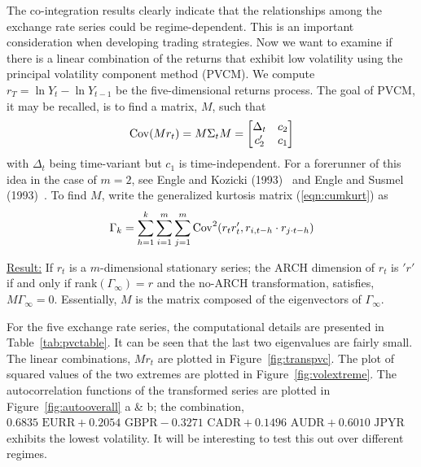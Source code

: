 The co-integration results clearly indicate that the relationships among the exchange rate series could be regime-dependent. This is an important consideration when developing trading strategies. Now we want to examine if there is a linear combination of the returns that exhibit low volatility using the principal volatility component method (PVCM). We compute $r_T=\ln Y_t - \ln Y_{t-1}$ be the five-dimensional returns process. The goal of PVCM, it may be recalled, is to find a matrix, $M$, such that
	\begin{equation}\label{eqn:covmatrixM}
	\Cov(Mr_t)= M \Sigma_t M= 
	\begin{bmatrix}
	\Delta_t & c_2 \\
	c_2' & c_1
	\end{bmatrix}
	\end{equation}	
with $\Delta_t$ being time-variant but $c_1$ is time-independent. For a forerunner of this idea in the case of $m=2$, see Engle and Kozicki (1993)~\cite{engle1993testing} and Engle and Susmel (1993)~\cite{engle1993common}. To find $M$, write the generalized kurtosis matrix (\ref{eqn:cumkurt}) as
	\begin{equation}\label{eqn:gammakurt}
	\Gamma_k= \sum_{h=1}^k \sum_{i=1}^m \sum_{j=1}^m \Cov^2(r_tr_t', r_{i,t-h} \cdot r_{j \cdot t-h})
	\end{equation}	

\noindent\underline{Result:} If $r_t$ is a $m$-dimensional stationary series; the ARCH dimension of $r_t$ is $'r'$ if and only if rank$(\Gamma_{\infty})=r$ and the no-ARCH transformation, satisfies, $M\Gamma_{\infty}=0$. Essentially, $M$ is the matrix composed of the eigenvectors of $\Gamma_{\infty}$.


For the five exchange rate series, the computational details are presented in Table~\ref{tab:pvctable}. It can be seen that the last two eigenvalues are fairly small. The linear combinations, $Mr_t$ are plotted in Figure~\ref{fig:transpvc}. The plot of squared values of the two extremes are plotted in Figure~\ref{fig:volextreme}. The autocorrelation functions of the transformed series are plotted in Figure~\ref{fig:autooverall} a \& b; the combination, $0.6835\text{ EURR} + 0.2054\text{ GBPR} - 0.3271\text{ CADR} + 0.1496\text{ AUDR} + 0.6010\text{ JPYR}$ exhibits the lowest volatility. It will be interesting to test this out over different regimes.

